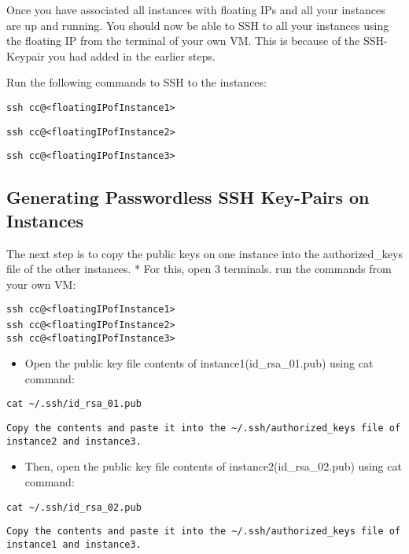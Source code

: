 Once you have associated all instances with floating IPs and all your
instances are up and running. You should now be able to SSH to all your
instances using the floating IP from the terminal of your own VM. This
is because of the SSH-Keypair you had added in the earlier steps.

Run the following commands to SSH to the instances:

\texttt{ssh\ cc@\textless{}floatingIPofInstance1\textgreater{}}

\texttt{ssh\ cc@\textless{}floatingIPofInstance2\textgreater{}}

\texttt{ssh\ cc@\textless{}floatingIPofInstance3\textgreater{}}

\subsection{Generating Passwordless SSH Key-Pairs on Instances}

The next step is to copy the public keys on one instance into the
authorized\_keys file of the other instances. * For this, open 3
terminals. run the commands from your own VM:

\texttt{ssh\ cc@\textless{}floatingIPofInstance1\textgreater{}}\\
\texttt{ssh\ cc@\textless{}floatingIPofInstance2\textgreater{}}~\\
\texttt{ssh\ cc@\textless{}floatingIPofInstance3\textgreater{}}

\begin{itemize}
\item
  Open the public key file contents of instance1(id\_rsa\_01.pub) using
  cat command:
\end{itemize}

\texttt{cat\ \textasciitilde{}/.ssh/id\_rsa\_01.pub}

\begin{lstlisting}
Copy the contents and paste it into the ~/.ssh/authorized_keys file of
instance2 and instance3.
\end{lstlisting}

\begin{itemize}
\item
  Then, open the public key file contents of instance2(id\_rsa\_02.pub)
  using cat command:
\end{itemize}

\texttt{cat\ \textasciitilde{}/.ssh/id\_rsa\_02.pub}

\begin{lstlisting}
Copy the contents and paste it into the ~/.ssh/authorized_keys file of
instance1 and instance3.
\end{lstlisting}

